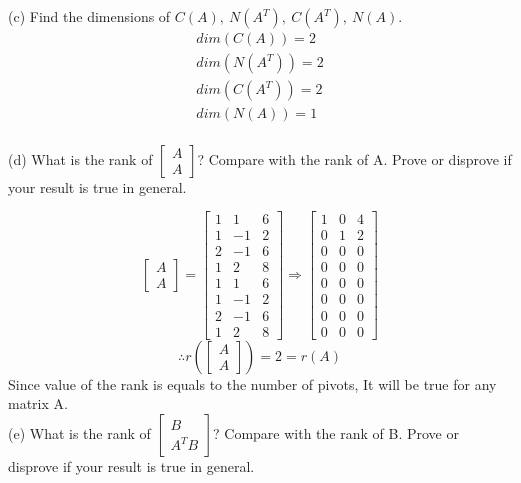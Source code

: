 (c) Find the dimensions of $C(A),\ N(A^T),\ C(A^T),\ N(A)$.
\begin{gather*}
    dim(C(A)) = 2\\dim(N(A^T))=2\\dim(C(A^T))=2\\dim(N(A)) = 1
\end{gather*}\\

(d) What is the rank of $\begin{bmatrix}
    A\\A
\end{bmatrix}$? Compare with the rank of A.
Prove or disprove if your result is true in general.

$$\begin{bmatrix}
    A\\A
\end{bmatrix}=\begin{bmatrix}
    1&1&6\\
    1&-1&2\\
    2&-1&6\\
    1&2&8\\
    1&1&6\\
    1&-1&2\\
    2&-1&6\\
    1&2&8
\end{bmatrix}\Rightarrow\begin{bmatrix}
    1&0&4\\
    0&1&2\\
    0&0&0\\
    0&0&0\\
    0&0&0\\
    0&0&0\\
    0&0&0\\
    0&0&0
\end{bmatrix}$$
$$\therefore r\left(\begin{bmatrix}
    A\\A
\end{bmatrix}\right) = 2 = r(A)$$
Since value of the rank is equals to the number of pivots, It will be true for any matrix A.\\

(e) What is the rank of $\begin{bmatrix}
    B\\A^TB
\end{bmatrix}$? Compare with the rank of B.
Prove or disprove if your result is true in general.

